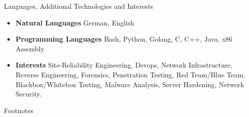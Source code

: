 \documentclass[]{mcdowellcv}
\begin{document}
\begin{cvsection}{Languages, Additional Technologies and Interests}
\begin{cvsubsection}{}{}{}
\begin{itemize}
\item \textbf{Natural Languages} German, English
\item \textbf{Programming Languages} Bash, Python, Golang, C, C++, Java, x86 Assembly
\item \textbf{Interests} Site-Reliability Engineering, Devops, Network Infrastructure, Reverse Engineering, Forensics, Penetration Testing, Red Team/Blue Team, Blackbox/Whitebox Testing, Malware Analysis, Server Hardening, Network Security.
\end{itemize}
\end{cvsubsection}
\end{cvsection}

\begin{cvsection}{Footnotes}
\theendnotes
\end{cvsection}
\end{document}
